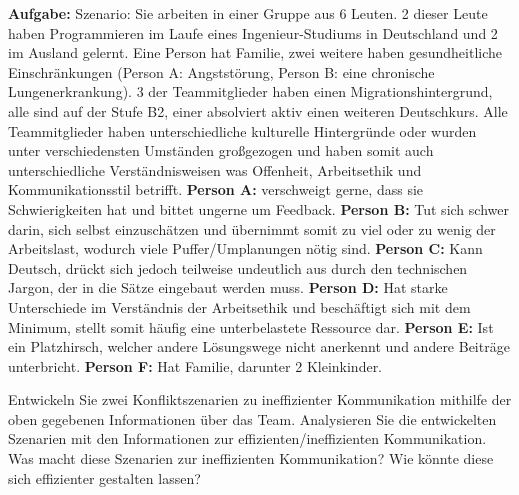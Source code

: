 \documentclass{article}
\begin{document}
\begin{itemize}
 

\begin{flushleft}
\textbf{Aufgabe:}\newline \newline
Szenario: Sie arbeiten in einer Gruppe aus 6 Leuten. 2 dieser Leute haben Programmieren im Laufe eines Ingenieur-Studiums in Deutschland und 2 im Ausland gelernt. Eine Person hat Familie, zwei weitere haben gesundheitliche Einschränkungen (Person A: Angststörung, Person B: eine chronische Lungenerkrankung). 3 der Teammitglieder haben einen Migrationshintergrund, alle sind auf der Stufe B2, einer absolviert aktiv einen weiteren Deutschkurs. Alle Teammitglieder haben unterschiedliche kulturelle Hintergründe oder wurden unter verschiedensten Umständen großgezogen und haben somit auch unterschiedliche Verständnisweisen was Offenheit, Arbeitsethik und Kommunikationsstil betrifft. \newline \newline \textbf{Person A:} verschweigt gerne, dass sie Schwierigkeiten hat und bittet ungerne um Feedback. \newline \textbf{Person B:} Tut sich schwer darin, sich selbst einzuschätzen und übernimmt somit zu viel oder zu wenig der Arbeitslast, wodurch viele Puffer/Umplanungen nötig sind. \newline \textbf{Person C:} Kann Deutsch, drückt sich jedoch teilweise undeutlich aus durch den technischen Jargon, der in die Sätze eingebaut werden muss. \newline \textbf{Person D:} Hat starke Unterschiede im Verständnis der Arbeitsethik und beschäftigt sich mit dem Minimum, stellt somit häufig eine unterbelastete Ressource dar. \newline \textbf{Person E:} Ist ein Platzhirsch, welcher andere Lösungswege nicht anerkennt und andere Beiträge unterbricht. \newline \textbf{Person F:} Hat Familie, darunter 2 Kleinkinder.
\newline \newline

Entwickeln Sie zwei Konfliktszenarien zu ineffizienter Kommunikation  mithilfe der oben gegebenen Informationen über das Team.\newline \newline
Analysieren Sie die entwickelten Szenarien mit den Informationen zur effizienten/ineffizienten Kommunikation. Was macht diese Szenarien zur ineffizienten Kommunikation? Wie könnte diese sich effizienter gestalten lassen?

\end{flushleft}


\end{itemize}
\end{document}
